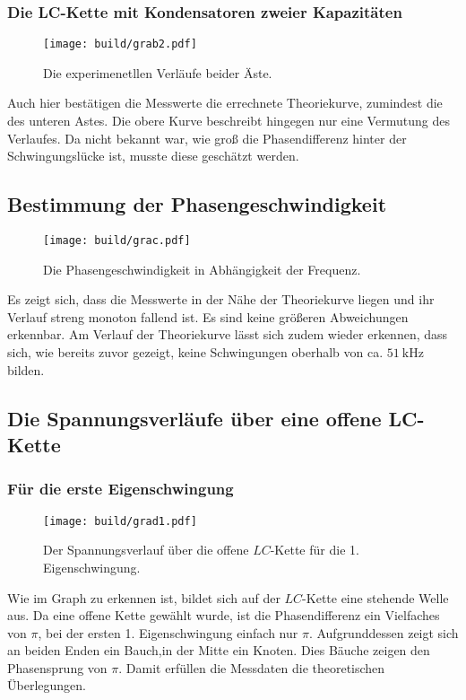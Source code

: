 \subsubsection{Die LC-Kette mit Kondensatoren zweier Kapazitäten}
\begin{figure}[H]
	\centering
	\caption{Die experimenetllen Verläufe beider Äste.}
	\texttt{[image: build/grab2.pdf]}
	\label{fig:grab2}
\end{figure}

Auch hier bestätigen die Messwerte die errechnete Theoriekurve,
 zumindest die des unteren Astes. Die obere Kurve beschreibt hingegen nur eine Vermutung des Verlaufes. Da
  nicht bekannt war, wie groß die Phasendifferenz hinter der Schwingungslücke ist,
	musste diese geschätzt werden.


\subsection{Bestimmung der Phasengeschwindigkeit}

\begin{figure}[H]
	\centering
	\caption{Die Phasengeschwindigkeit in Abhängigkeit der Frequenz.}
	\texttt{[image: build/grac.pdf]}
	\label{fig:grac}
\end{figure}

Es zeigt sich, dass die Messwerte in der Nähe der Theoriekurve liegen und ihr Verlauf
 streng monoton fallend ist. Es sind keine größeren Abweichungen erkennbar. Am
  Verlauf der Theoriekurve lässt sich zudem wieder erkennen, dass sich, wie bereits zuvor
 gezeigt, keine Schwingungen oberhalb von ca. $\SI{51}{\kilo\hertz}$ bilden.

\subsection{Die Spannungsverläufe über eine offene LC-Kette}
\subsubsection{Für die erste Eigenschwingung}
\begin{figure}[H]
	\centering
	\caption{Der Spannungsverlauf über die offene $LC$-Kette für die 1. Eigenschwingung.}
	\texttt{[image: build/grad1.pdf]}
	\label{fig:grad1}
\end{figure}
Wie im Graph zu erkennen ist, bildet sich auf der $LC$-Kette eine stehende Welle aus.
 Da eine offene Kette gewählt wurde, ist die Phasendifferenz ein Vielfaches
  von $\pi$, bei der ersten 1. Eigenschwingung einfach nur $\pi$. Aufgrunddessen zeigt
 sich an beiden Enden ein Bauch,in der Mitte ein Knoten. Dies Bäuche zeigen
  den Phasensprung von $\pi$. Damit erfüllen die Messdaten die
theoretischen Überlegungen.
